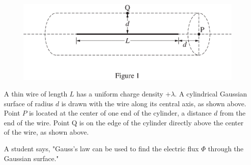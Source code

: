 %
\begin{figure}[H]
\centering
\includegraphics[scale=0.3]{images/img-022-035.png}
\end{figure}


\question
A thin wire of length $L$ has a uniform charge density $+\lambda$. A cylindrical Gaussian surface of radius $d$ is drawn with the wire along its central axis, as shown above. Point $P$ is located at the center of one end of the cylinder, a distance $d$ from the end of the wire. Point $\mathrm{Q}$ is on the edge of the cylinder directly above the center of the wire, as shown above.

A student says, "Gauss's law can be used to find the electric flux $\Phi$ through the Gaussian surface." %

